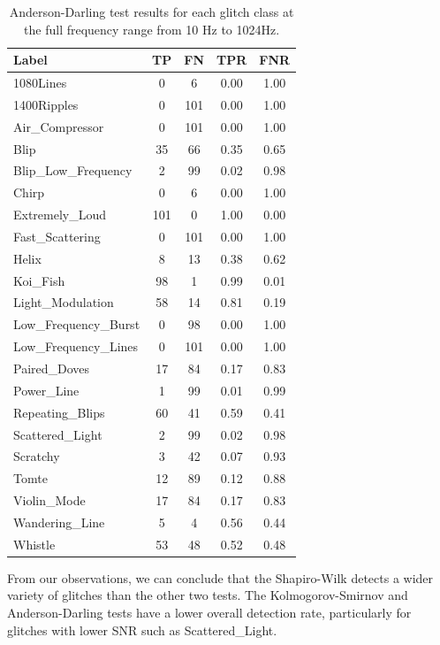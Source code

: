 \documentclass[12pt]{article}
\begin{document}
\begin{table}[H]
  \centering
  \begin{tabular}{lcccc}
  \toprule
  Label & TP & FN & TPR & FNR \\
  \midrule
  1080Lines & 0 & 6 & 0.00 & 1.00 \\
  1400Ripples & 0 & 101 & 0.00 & 1.00 \\
  Air\_Compressor & 0 & 101 & 0.00 & 1.00 \\
  Blip & 35 & 66 & 0.35 & 0.65 \\
  Blip\_Low\_Frequency & 2 & 99 & 0.02 & 0.98 \\
  Chirp & 0 & 6 & 0.00 & 1.00 \\
  Extremely\_Loud & 101 & 0 & 1.00 & 0.00 \\
  Fast\_Scattering & 0 & 101 & 0.00 & 1.00 \\
  Helix & 8 & 13 & 0.38 & 0.62 \\
  Koi\_Fish & 98 & 1 & 0.99 & 0.01 \\
  Light\_Modulation & 58 & 14 & 0.81 & 0.19 \\
  Low\_Frequency\_Burst & 0 & 98 & 0.00 & 1.00 \\
  Low\_Frequency\_Lines & 0 & 101 & 0.00 & 1.00 \\
  Paired\_Doves & 17 & 84 & 0.17 & 0.83 \\
  Power\_Line & 1 & 99 & 0.01 & 0.99 \\
  Repeating\_Blips & 60 & 41 & 0.59 & 0.41 \\
  Scattered\_Light & 2 & 99 & 0.02 & 0.98 \\
  Scratchy & 3 & 42 & 0.07 & 0.93  \\
  Tomte & 12 & 89 & 0.12 & 0.88  \\
  Violin\_Mode & 17 & 84 & 0.17 & 0.83 \\
  Wandering\_Line & 5 & 4 & 0.56 & 0.44 \\
  Whistle & 53 & 48 & 0.52 & 0.48 \\
  \bottomrule
  \end{tabular}
  \caption{Anderson-Darling test results for each glitch class at the full frequency range from 10 Hz to 1024Hz.}
  \label{tab:ad_full_range_results}
\end{table}

\noindent From our observations, we can conclude that the Shapiro-Wilk detects a wider variety of glitches than the other two tests. The Kolmogorov-Smirnov and Anderson-Darling tests have a lower overall detection rate, particularly for glitches with lower SNR such as Scattered\_Light.
\end{document}
